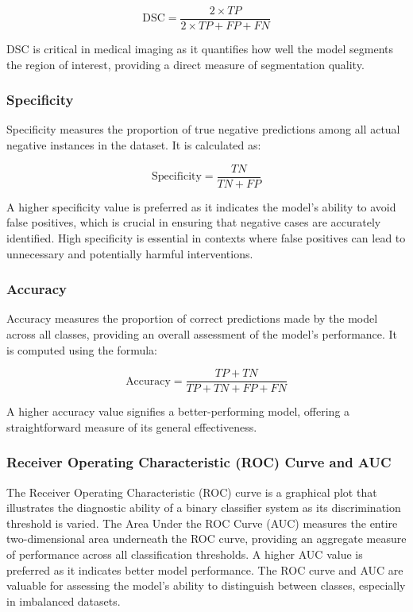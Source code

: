 \[
\text{DSC} = \frac{2 \times TP}{2 \times TP + FP + FN}
\]

DSC is critical in medical imaging as it quantifies how well the model segments the region of interest, providing a direct measure of segmentation quality.

\subsubsection{Specificity}

Specificity measures the proportion of true negative predictions among all actual negative instances in the dataset. It is calculated as:

\[
\text{Specificity} = \frac{TN}{TN + FP}
\]

A higher specificity value is preferred as it indicates the model's ability to avoid false positives, which is crucial in ensuring that negative cases are accurately identified. High specificity is essential in contexts where false positives can lead to unnecessary and potentially harmful interventions.

\subsubsection{Accuracy}

Accuracy measures the proportion of correct predictions made by the model across all classes, providing an overall assessment of the model's performance. It is computed using the formula:

\[
\text{Accuracy} = \frac{TP + TN}{TP + TN + FP + FN}
\]

A higher accuracy value signifies a better-performing model, offering a straightforward measure of its general effectiveness.

\subsubsection{Receiver Operating Characteristic (ROC) Curve and AUC}

The Receiver Operating Characteristic (ROC) curve is a graphical plot that illustrates the diagnostic ability of a binary classifier system as its discrimination threshold is varied. The Area Under the ROC Curve (AUC) measures the entire two-dimensional area underneath the ROC curve, providing an aggregate measure of performance across all classification thresholds. A higher AUC value is preferred as it indicates better model performance. The ROC curve and AUC are valuable for assessing the model's ability to distinguish between classes, especially in imbalanced datasets.

